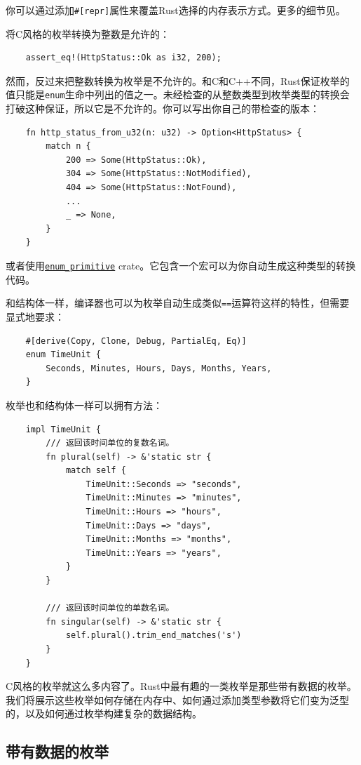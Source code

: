 你可以通过添加\texttt{\#[repr]}属性来覆盖Rust选择的内存表示方式。更多的细节见。

将C风格的枚举转换为整数是允许的：
\begin{verbatim}
    assert_eq!(HttpStatus::Ok as i32, 200);
\end{verbatim}

然而，反过来把整数转换为枚举是不允许的。和C和C++不同，Rust保证枚举的值只能是\texttt{enum}生命中列出的值之一。未经检查的从整数类型到枚举类型的转换会打破这种保证，所以它是不允许的。你可以写出你自己的带检查的版本：
\begin{verbatim}
    fn http_status_from_u32(n: u32) -> Option<HttpStatus> {
        match n {
            200 => Some(HttpStatus::Ok),
            304 => Some(HttpStatus::NotModified),
            404 => Some(HttpStatus::NotFound),
            ...
            _ => None,
        }
    }
\end{verbatim}

或者使用\href{https://crates.io/crates/enum_primitive}{\texttt{enum\_primitive}} crate。它包含一个宏可以为你自动生成这种类型的转换代码。

和结构体一样，编译器也可以为枚举自动生成类似\texttt{==}运算符这样的特性，但需要显式地要求：
\begin{verbatim}
    #[derive(Copy, Clone, Debug, PartialEq, Eq)]
    enum TimeUnit {
        Seconds, Minutes, Hours, Days, Months, Years,
    }
\end{verbatim}

枚举也和结构体一样可以拥有方法：
\begin{verbatim}
    impl TimeUnit {
        /// 返回该时间单位的复数名词。
        fn plural(self) -> &'static str {
            match self {
                TimeUnit::Seconds => "seconds",
                TimeUnit::Minutes => "minutes",
                TimeUnit::Hours => "hours",
                TimeUnit::Days => "days",
                TimeUnit::Months => "months",
                TimeUnit::Years => "years",
            }
        }

        /// 返回该时间单位的单数名词。
        fn singular(self) -> &'static str {
            self.plural().trim_end_matches('s')
        }
    }
\end{verbatim}

C风格的枚举就这么多内容了。Rust中最有趣的一类枚举是那些带有数据的枚举。我们将展示这些枚举如何存储在内存中、如何通过添加类型参数将它们变为泛型的，以及如何通过枚举构建复杂的数据结构。

\subsection{带有数据的枚举}

